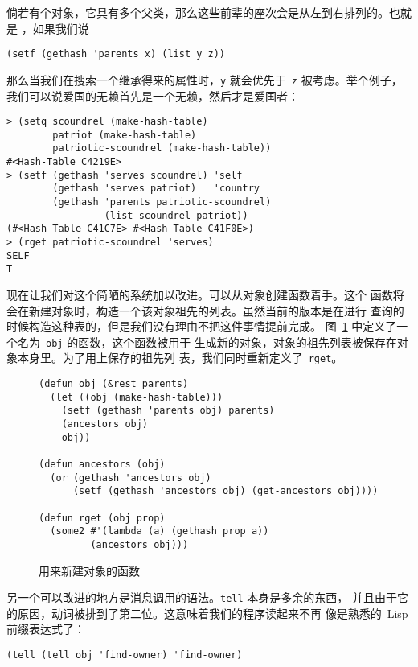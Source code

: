倘若有个对象，它具有多个父类，那么这些前辈的座次会是从左到右排列的。也就是
，如果我们说
\begin{lstlisting}
(setf (gethash 'parents x) (list y z))
\end{lstlisting}
那么当我们在搜索一个继承得来的属性时，\texttt{y} 就会优先于~\texttt{z}
被考虑。举个例子，我们可以说爱国的无赖首先是一个无赖，然后才是爱国者：
\begin{lstlisting}
> (setq scoundrel (make-hash-table)
        patriot (make-hash-table)
        patriotic-scoundrel (make-hash-table))
#<Hash-Table C4219E>
> (setf (gethash 'serves scoundrel) 'self
        (gethash 'serves patriot)   'country 
        (gethash 'parents patriotic-scoundrel)
                 (list scoundrel patriot))
(#<Hash-Table C41C7E> #<Hash-Table C41F0E>)
> (rget patriotic-scoundrel 'serves)
SELF
T
\end{lstlisting}

现在让我们对这个简陋的系统加以改进。可以从对象创建函数着手。这个
函数将会在新建对象时，构造一个该对象祖先的列表。虽然当前的版本是在进行
查询的时候构造这种表的，但是我们没有理由不把这件事情提前完成。
图~\ref{fig:a_function_to_create_objects} 中定义了一个名为~\texttt{obj} 的函数，这个函数被用于
生成新的对象，对象的祖先列表被保存在对象本身里。为了用上保存的祖先列
表，我们同时重新定义了~\texttt{rget}。
\begin{figure}
\begin{lstlisting}
(defun obj (&rest parents)
  (let ((obj (make-hash-table)))
    (setf (gethash 'parents obj) parents)
    (ancestors obj)
    obj))

(defun ancestors (obj)
  (or (gethash 'ancestors obj)
      (setf (gethash 'ancestors obj) (get-ancestors obj))))

(defun rget (obj prop)
  (some2 #'(lambda (a) (gethash prop a))
         (ancestors obj)))
\end{lstlisting}
\caption{\label{fig:a_function_to_create_objects}用来新建对象的函数}
\end{figure}

另一个可以改进的地方是消息调用的语法。\texttt{tell} 本身是多余的东西，
并且由于它的原因，动词被排到了第二位。这意味着我们的程序读起来不再
像是熟悉的~Lisp 前缀表达式了：
\begin{lstlisting}
(tell (tell obj 'find-owner) 'find-owner)
\end{lstlisting}

